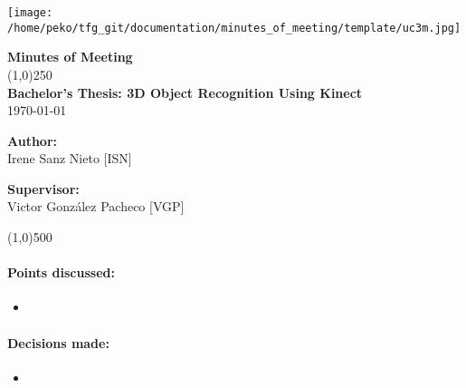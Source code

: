 \documentclass{article}
\begin{document}
\texttt{[image: /home/peko/tfg\_git/documentation/minutes\_of\_meeting/template/uc3m.jpg]}

\vspace{-1cm}
\begin{minipage}[b]{1\linewidth}
	\begin{center}
	{\Huge \bfseries{Minutes of Meeting}}\\
	\line(1,0){250}\\[1cm]
	{\LARGE \textbf{Bachelor's Thesis: 3D Object Recognition Using Kinect}}\\[0.5cm]
	{\large \today}
	\end{center}
\end {minipage}



\begin{minipage}{0.55\textwidth}
\begin{flushleft} \large
\textbf{{Author:}\\}
Irene Sanz Nieto [ISN]\\
\end{flushleft}
\end{minipage}
\begin{minipage}{0.4\textwidth}
\begin{flushright} \large
\textbf{Supervisor: }\\
Victor González Pacheco [VGP]
\end{flushright}\end{minipage}

\begin{center}
\line(1,0){500}
\end{center}
\vspace{1cm}

\paragraph{\LARGE Points discussed: }
	\begin{itemize}
		\item\textbf{}
					
	\end{itemize}
	
\vspace{1cm}


\paragraph{\LARGE Decisions made:}
	\begin{itemize}
		\item\textbf{}\\
			
	\end{itemize}
\end{document}
